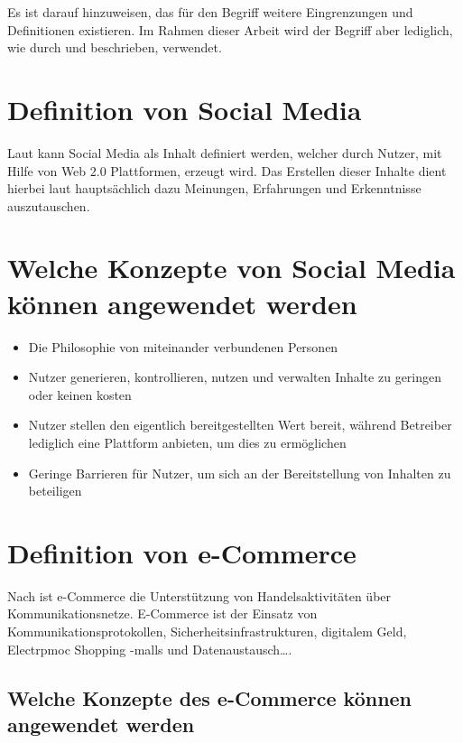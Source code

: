 Es ist darauf hinzuweisen, das für den Begriff  weitere Eingrenzungen und Definitionen existieren. Im Rahmen dieser Arbeit wird der Begriff aber lediglich, wie durch \textcite{oreilly:web20} und \textcite{oreilly:levels-of-web20} beschrieben, verwendet.


\section{Definition von Social Media}

Laut \textcite[S. 8]{turban:sc} kann Social Media als Inhalt definiert werden, welcher durch Nutzer, mit Hilfe von Web 2.0 Plattformen, erzeugt wird. Das Erstellen dieser Inhalte dient hierbei laut \textcite[S. 8]{turban:sc} hauptsächlich dazu Meinungen, Erfahrungen und Erkenntnisse auszutauschen.


\section{Welche Konzepte von Social Media können angewendet werden}

\begin{itemize}
\item Die Philosophie von miteinander verbundenen Personen \parencite[S. 8]{turban:sc}
\item Nutzer generieren, kontrollieren, nutzen und verwalten Inhalte zu geringen
oder keinen kosten \parencite[S. 8]{turban:sc}
\item Nutzer stellen den eigentlich bereitgestellten Wert bereit, während Betreiber lediglich eine Plattform anbieten, um dies zu ermöglichen  \parencite[S. 8]{turban:sc}
\item Geringe Barrieren für Nutzer, um sich an der Bereitstellung von Inhalten zu beteiligen \parencite[S. 8]{turban:sc}
\end{itemize}


\section{Definition von  e-Commerce}

Nach \textcite[S. 20]{merz:e-commerce} ist e-Commerce  \glqq die Unterstützung von Handelsaktivitäten über Kommunikationsnetze\grqq. E-Commerce ist der Einsatz von Kommunikationsprotokollen, Sicherheitsinfrastrukturen, digitalem Geld, Electrpmoc Shopping -malls und Datenaustausch….\grqq


\subsection{Welche Konzepte des e-Commerce können angewendet werden}

